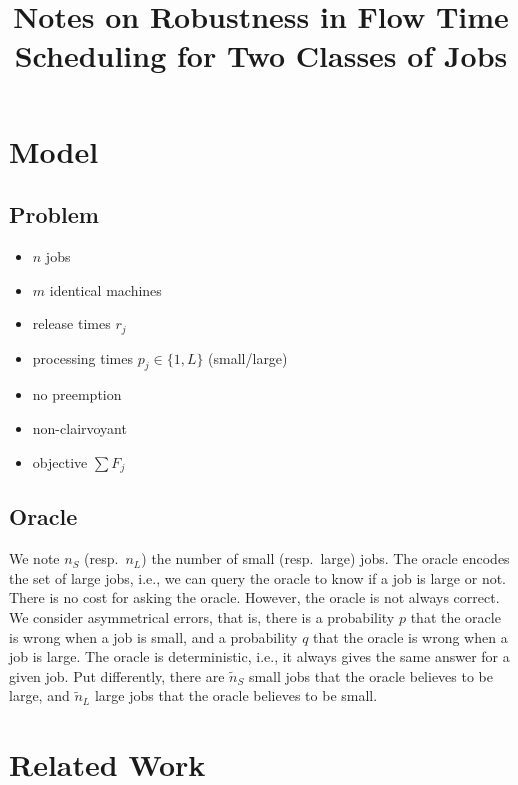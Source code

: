 \documentclass{article}
\title{Notes on Robustness in Flow Time Scheduling for Two Classes of Jobs}
\begin{document}
\maketitle

\section{Model}

\subsection{Problem}

\begin{itemize}
    \item \(n\) jobs
    \item \(m\) identical machines
    \item release times \(r_j\)
    \item processing times \(p_j\in\{1,L\}\) (small/large)
    \item no preemption
    \item non-clairvoyant
    \item objective \(\sum F_j\)
\end{itemize}

\subsection{Oracle}

We note \(n_S\) (resp.\ \(n_L\)) the number of small (resp.\ large) jobs. The oracle encodes the set
of large jobs, i.e., we can query the oracle to know if a job is large or not. There is no cost for
asking the oracle. However, the oracle is not always correct. We consider asymmetrical errors, that
is, there is a probability \(p\) that the oracle is wrong when a job is small, and a probability
\(q\) that the oracle is wrong when a job is large. The oracle is deterministic, i.e., it always
gives the same answer for a given job. Put differently, there are \(\tilde{n}_S\) small jobs that
the oracle believes to be large, and \(\tilde{n}_L\) large jobs that the oracle believes to be
small.

\section{Related Work}
\end{document}
